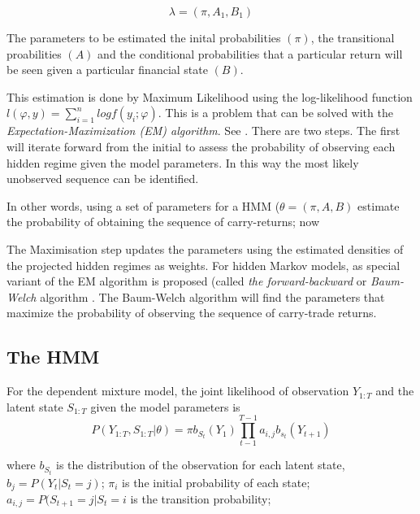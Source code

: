 \documentclass[12pt, a4paper, oneside]{article} %
\begin{document}
\begin{equation}
\lambda = (\pi, A_1, B_1)
\end{equation}

The parameters to be estimated the inital probabilities $(\pi)$, the transitional proabilities $(A)$ and the conditional probabilities that a particular return will be seen given a particular financial state $(B)$. 

This estimation is done by Maximum Likelihood using the log-likelihood function $l(\varphi, y) = \sum_{i=1}^n log f(y_i; \varphi)$. This is a problem that can be solved with the \emph{Expectation-Maximization (EM) algorithm}.  See \citet{dempster1977maximum}. There are two steps. The first will iterate forward from the initial  to assess the probability of observing each hidden regime given the model parameters.  In this way the most likely unobserved sequence can be identified.  

In other words, using a set of parameters for a HMM ($\theta = (\pi, A, B)$ estimate the probability of obtaining the sequence of carry-returns; now 


The Maximisation step updates the parameters using the estimated densities of the projected hidden regimes as weights. For hidden Markov models, as special variant of the EM algorithm is proposed (called \emph{the forward-backward} or \emph{Baum-Welch} algorithm \citet{Baum1970}.   The Baum-Welch algorithm will find the parameters that maximize the probability of observing the sequence of carry-trade returns.  


\subsection{The HMM}
For the dependent mixture model, the joint likelihood of observation $Y_{1:T}$ and the latent state $S_{1:T}$ given the model parameters is 
\begin{equation}
P(Y_{1:T}, S_{1:T}|\theta) = \pi b_{S_t}(Y_1)\prod_{t-1}^{T-1} a_{i,j}b_{s_t}(Y_{t+1})
\end{equation}

where $b_{S_t}$ is the distribution of the observation for each latent state, $b_j = P(Y_t|S_t = j)$; $\pi_i$ is the initial probability of each state; $a_{i,j} = P(S_{t+1} = j| S_t = i$ is the transition probability;  
\end{document}
